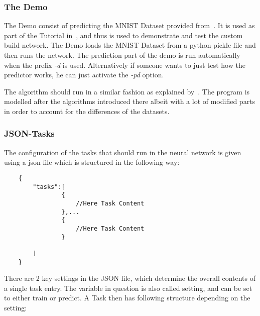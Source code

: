 \documentclass[12pt]{article}
\begin{document}
\subsubsection{The Demo}
\label{subsub:demo}
The Demo consist of predicting the MNIST Dataset provided from~\cite{MNISTSite}. It is used as part of the Tutorial in~\cite{deepLearning.org}, and thus is used to demonstrate and test the custom build network. The Demo loads the MNIST Dataset from a python pickle file and then runs the network. The prediction part of the demo is run automatically when the prefix \emph{-d} is used. Alternatively if someone wants to just test how the predictor works, he can just activate the \emph{-pd} option.

The algorithm should run in a similar fashion as explained by~\cite{theanoTutorial}. The program is modelled after the algorithms introduced there albeit with a lot of modified parts in order to account for the differences of the datasets.

\subsubsection{JSON-Tasks}
\label{subsub:json}

The configuration of the tasks that should run in the neural network is given using a json file which is structured in the following way:
\begin{verbatim}
    {
        "tasks":[
                {
                    //Here Task Content    
                },...
                {
                    //Here Task Content 
                }
        
        ]
    }
\end{verbatim}

There are 2 key settings in the JSON file, which determine the overall contents of a single task entry. The variable in question is also called setting, and can be set to either train or predict. A Task then has following structure depending on the setting:
\end{document}
